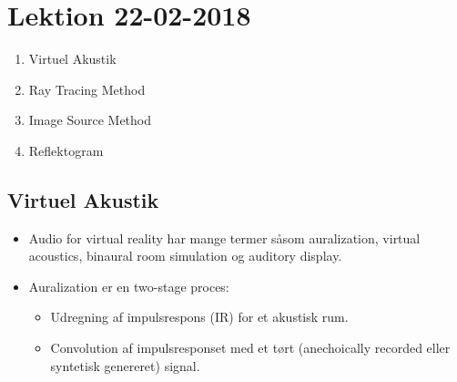 \section{Lektion 22-02-2018}

\begin{enumerate}
	\item Virtuel Akustik
	\item Ray Tracing Method
	\item Image Source Method
	\item Reflektogram
\end{enumerate}

\noindent{} \vspace{3mm}

\subsection{Virtuel Akustik}
\begin{itemize}
	\item Audio for virtual reality har mange termer såsom auralization, virtual acoustics, binaural room simulation  og auditory display.
	\item Auralization er en two-stage proces:
	\begin{itemize}
		\item Udregning af impulsrespons (IR) for et akustisk rum.
		\item Convolution af impulsresponset med et tørt (anechoically
		recorded eller syntetisk genereret) signal.
	\end{itemize} 
\end{itemize}

